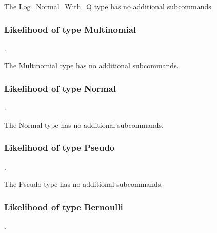 The Log\_Normal\_With\_Q type has no additional subcommands.

\subsubsection{Likelihood of type Multinomial}
.
\label{syntax:Likelihood-Multinomial}

The Multinomial type has no additional subcommands.

\subsubsection{Likelihood of type Normal}
.
\label{syntax:Likelihood-Normal}

The Normal type has no additional subcommands.

\subsubsection{Likelihood of type Pseudo}
.
\label{syntax:Likelihood-Pseudo}

The Pseudo type has no additional subcommands.

\subsubsection{Likelihood of type Bernoulli}
.
\label{syntax:Likelihood-Bernoulli}
